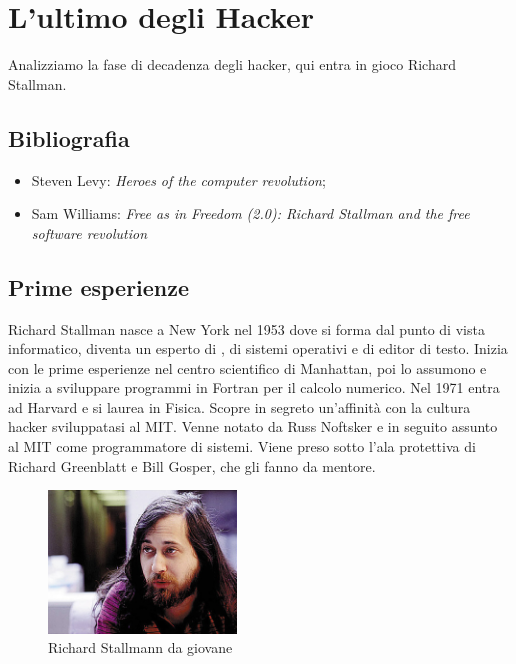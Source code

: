 \section{L'ultimo degli Hacker}

Analizziamo la fase di decadenza degli hacker, qui entra in gioco Richard Stallman.

\subsection{Bibliografia}

\begin{itemize}

\item Steven Levy: \textit{Heroes of the computer revolution};
\item Sam Williams: \textit{Free as in Freedom (2.0): Richard Stallman and the free software revolution}

\end{itemize}

\subsection{Prime esperienze}

Richard Stallman nasce a New York nel 1953 dove si forma dal punto di vista informatico, diventa un esperto di , di sistemi operativi e di editor di testo. Inizia con le prime esperienze nel centro scientifico di Manhattan, poi lo assumono e inizia a sviluppare programmi in Fortran per il calcolo numerico. Nel 1971 entra ad Harvard e si laurea in Fisica. Scopre in segreto un'affinità con la cultura hacker sviluppatasi al MIT. Venne notato da Russ Noftsker e in seguito assunto al MIT come programmatore di sistemi. Viene preso sotto l'ala protettiva di Richard Greenblatt e Bill Gosper, che gli fanno da mentore.

\begin{figure}[htbp]
\centering
\includegraphics[width=50mm]{images/stallman.jpg}
\caption{Richard Stallmann da giovane}
\end{figure}

